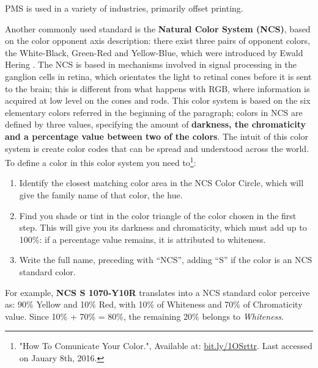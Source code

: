 PMS is used in a variety of industries, primarily offset printing. \par
%
Another commonly used standard is the \textbf{Natural Color System (NCS)},  based on the color opponent
axis description: there exist three pairs of opponent colors, the White-Black, Green-Red and Yellow-Blue,
which were introduced by Ewald Hering \cite{Ware2012}. The NCS is based in mechanisms involved in signal processing
in the ganglion cells in retina, which orientates the light to retinal cones before it is sent to the brain;
this is different from what happens with RGB, where information is acquired at low level on the cones and
rods. This color system is based on the six elementary colors referred in the beginning of the paragraph;
colors in NCS are defined by three values, specifying the amount of \textbf{darkness, the chromaticity and a
percentage value between two of the colors}. The intuit of this color system is
create color codes that can be spread and understood across the world. To define a color in this color
system you need to\footnote{\label{ncshowto}"How To Comunicate Your Color.", Available at: \url {bit.ly/1OSrttr}. Last accessed on Jauary 8th, 2016.}:
%
\begin{enumerate}
	\setlength\itemsep{0.01em}
	\item Identify the closest matching color area in the NCS Color Circle, which will give the family name
    of that color, the hue.
	\item Find you shade or tint in the color triangle of the color chosen in the first step. This will give
    you its darkness and chromaticity, which must add up to 100\%: if a percentage value remains, it is
    attributed to whiteness.
	\item Write the full name, preceding with “NCS”, adding “S” if the color is an NCS standard color.
\end{enumerate} \par
%
For example, \textbf{NCS S 1070-Y10R} translates into a NCS standard color perceive as: 90\% Yellow and
10\% Red, with 10\% of Whiteness and 70\% of Chromaticity value. Since 10\% + 70\% = 80\%, the remaining
20\% belongs to \emph{Whiteness}.
%
